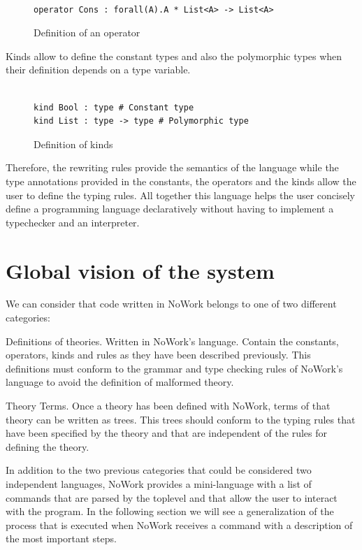 \documentclass[12pt,a4paper]{article}
\begin{document}
\begin{figure}[!h]
\begin{verbatim}

operator Cons : forall(A).A * List<A> -> List<A>

\end{verbatim}
\caption{Definition of an operator}
\end{figure}

Kinds allow to define the constant types and also the polymorphic types when
their definition depends on a type variable.

\begin{figure}[!h]
\begin{verbatim}

kind Bool : type # Constant type
kind List : type -> type # Polymorphic type
\end{verbatim}
\caption{Definition of kinds}
\end{figure}

Therefore, the rewriting rules provide the semantics of the language
while the type annotations provided in the constants, the operators and
the kinds allow the user to define the typing rules. All together
this language helps the user concisely define a programming language
declaratively without having to implement a typechecker and
an interpreter.

\section{Global vision of the system}

We can consider that code written in NoWork belongs to one of two
different categories:

Definitions of theories. Written in NoWork's language. Contain the
constants, operators, kinds and rules as they have been described
previously. This definitions must conform to the grammar and type
checking rules of NoWork's language to avoid the definition of
malformed theory.

Theory Terms. Once a theory has been defined with NoWork, terms of
that theory can be written as trees. This trees should conform to the
typing rules that have been specified by the theory and that are
independent of the rules for defining the theory.

In addition to the two previous categories that could be considered two independent 
languages, NoWork provides a mini-language with a list of commands that are parsed by
the toplevel and that allow the user to interact with the
program. In the following section we will see a generalization of the process that is
executed when NoWork receives a command with a description of the most important steps.
\end{document}
